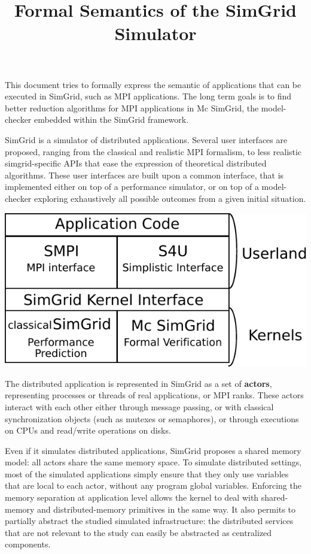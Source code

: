 \documentclass[a4paper,11pt]{article}
\title{Formal Semantics of the SimGrid Simulator}
\theoremstyle{break}
\begin{document}
\maketitle

This document tries to formally express the semantic of applications that can be executed in SimGrid, such as MPI applications. The long term goals is to find better reduction algorithms for MPI applications in Mc SimGrid, the model-checker embedded within the SimGrid framework.

\medskip

SimGrid is a simulator of distributed applications. Several user interfaces are proposed, ranging from the classical and realistic MPI formalism, to less realistic simgrid-specific APIs that ease the expression of theoretical distributed algorithms. These user interfaces are built upon a common interface, that is implemented either on top of a performance simulator, or on top of a model-checker exploring exhaustively all possible outcomes from a given initial situation.

\centerline{\includegraphics[scale=.6]{Figures/simgrid-architecture.pdf}}

The distributed application is represented in SimGrid as a set of \textbf{actors}, representing  
processes or threads of real applications, or MPI ranks. These actors  interact with each other either through message passing, or with classical synchronization objects (such as mutexes or semaphores), or through executions on CPUs and read/write  operations on disks.

Even if it simulates distributed applications, SimGrid proposes a shared memory model: all actors share the same memory space. To simulate distributed settings, most of the simulated applications simply ensure that they only use variables that are local to each actor, without any program global variables. Enforcing the memory separation at application level allows the kernel to deal with shared-memory and distributed-memory primitives in the same way. It also permits to partially abstract the studied simulated infrastructure: the distributed services that are not relevant to the study can easily be abstracted as centralized components.
\end{document}
